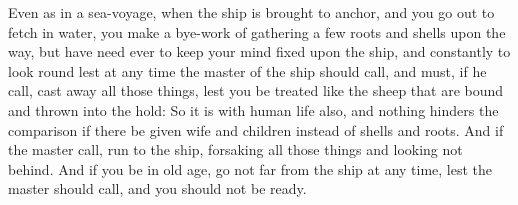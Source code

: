 Even as in a sea-voyage, when the ship  is brought to anchor, and you go out to
fetch in water,  you make a bye-work  of gathering a few roots  and shells upon
the  way, but  have  need ever  to  keep your  mind fixed  upon  the ship,  and
constantly to look round  lest at any time the master of  the ship should call,
and must, if he call, cast away all  those things, lest you be treated like the
sheep that are bound  and thrown into the hold: So it is  with human life also,
and nothing hinders the comparison if  there be given wife and children instead
of shells  and roots. And if  the master call,  run to the ship,  forsaking all
those things and looking not behind. And if  you be in old age, go not far from
the ship at any time, lest the master should call, and you should not be ready.
